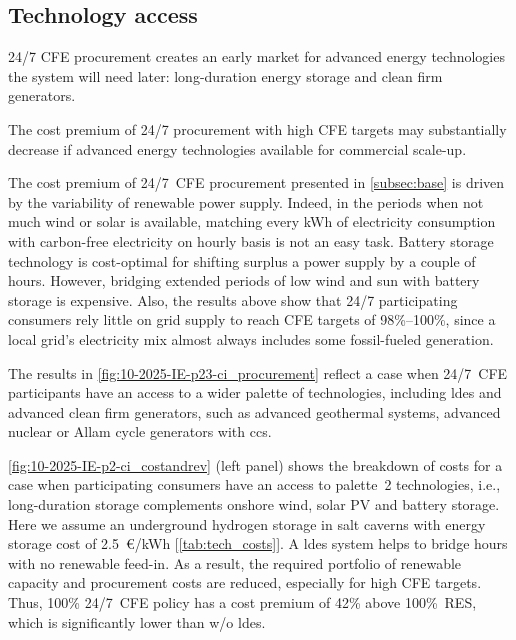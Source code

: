 \subsection{Technology access}
\label{subsec:palette}

\begin{res}
    24/7 CFE procurement creates an early market for advanced energy technologies the system will need later: long-duration energy storage and clean firm generators.
\end{res}

\begin{res}
    The cost premium of 24/7 procurement with high CFE targets may substantially decrease if advanced energy technologies available for commercial scale-up. 
\end{res}

The cost premium of 24/7~CFE procurement presented in \cref{subsec:base} is driven by the variability of renewable power supply.
Indeed, in the periods when not much wind or solar is available, matching every kWh of electricity consumption with carbon-free electricity on hourly basis is not an easy task.
Battery storage technology is cost-optimal for shifting surplus a power supply by a couple of hours.
However, bridging extended periods of low wind and sun with battery storage is expensive.
Also, the results above show that 24/7 participating consumers rely little on grid supply to reach CFE targets of 98\%--100\%, since a local grid's electricity mix almost always includes some fossil-fueled generation.

The results in \cref{fig:10-2025-IE-p23-ci_procurement} reflect a case when 24/7~CFE participants have an access to a wider palette of technologies, including \gls{ldes} and advanced clean firm generators, such as advanced geothermal systems, advanced nuclear or Allam cycle generators with \gls{ccs}.

\cref{fig:10-2025-IE-p2-ci_costandrev} (left panel) shows the breakdown of costs for a case when participating consumers have an access to palette~2 technologies, i.e., long-duration storage complements onshore wind, solar PV and battery storage.
Here we assume an underground hydrogen storage in salt caverns with energy storage cost of 2.5~\euro/kWh [\cref{tab:tech_costs}].
A \gls{ldes} system helps to bridge hours with no renewable feed-in. 
As a result, the required portfolio of renewable capacity and procurement costs are reduced, especially for high CFE targets.
Thus, 100\% 24/7~CFE policy has a cost premium of 42\% above 100\%~RES, which is significantly lower than w/o \gls{ldes}.

